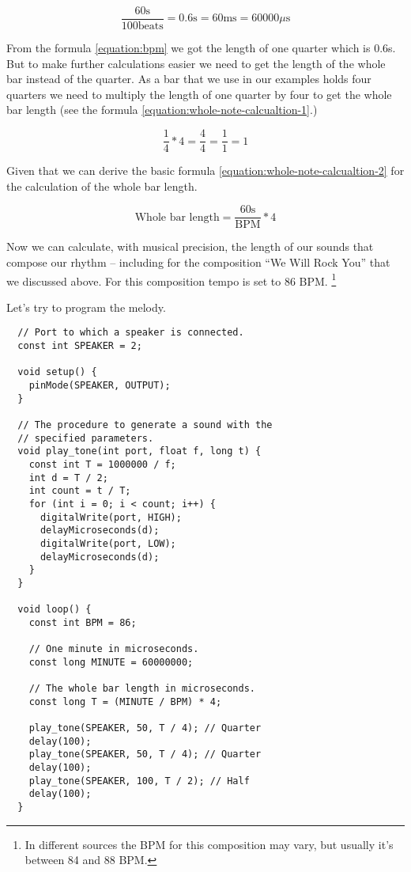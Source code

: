 \documentclass[../sparc.tex]{subfiles}
\begin{document}
\begin{equation}
  \frac{60 \mbox{s}}{100 \mbox{beats}} = 0.6 \mbox{s} = 60 \mbox{ms} = 60000 \mu\mbox{s}
  \label{equation:bpm}
\end{equation}

From the formula \ref{equation:bpm} we got the length of one quarter which is
0.6s.  But to make further calculations easier we need to get the length of the
whole bar instead of the quarter.  As a bar that we use in our examples holds
four quarters we need to multiply the length of one quarter by four to get the
whole bar length (see the formula \ref{equation:whole-note-calcualtion-1}.)

\begin{equation}
  \frac{1}{4} * 4 = \frac{4}{4} = \frac{1}{1} = 1
  \label{equation:whole-note-calcualtion-1}
\end{equation}

Given that we can derive the basic formula
\ref{equation:whole-note-calcualtion-2} for the calculation of the whole bar
length.

\begin{equation}
  \mbox{Whole bar length} = \frac{60 \mbox{s}}{\mbox{BPM}} * 4
  \label{equation:whole-note-calcualtion-2}
\end{equation}

Now we can calculate, with musical precision, the length of our sounds that
compose our rhythm -- including for the composition ``We Will Rock You'' that we
discussed above.  For this composition tempo is set to 86 BPM. \footnote{In
different sources the BPM for this composition may vary, but usually it's
between 84 and 88 BPM.}

Let's try to program the melody.

\begin{verbatim}
  // Port to which a speaker is connected.
  const int SPEAKER = 2;

  void setup() {
    pinMode(SPEAKER, OUTPUT);
  }

  // The procedure to generate a sound with the
  // specified parameters.
  void play_tone(int port, float f, long t) {
    const int T = 1000000 / f;
    int d = T / 2;
    int count = t / T;
    for (int i = 0; i < count; i++) {
      digitalWrite(port, HIGH);
      delayMicroseconds(d);
      digitalWrite(port, LOW);
      delayMicroseconds(d);
    }
  }

  void loop() {
    const int BPM = 86;

    // One minute in microseconds.
    const long MINUTE = 60000000;

    // The whole bar length in microseconds.
    const long T = (MINUTE / BPM) * 4;

    play_tone(SPEAKER, 50, T / 4); // Quarter
    delay(100);
    play_tone(SPEAKER, 50, T / 4); // Quarter
    delay(100);
    play_tone(SPEAKER, 100, T / 2); // Half
    delay(100);
  }
\end{verbatim}
\end{document}
